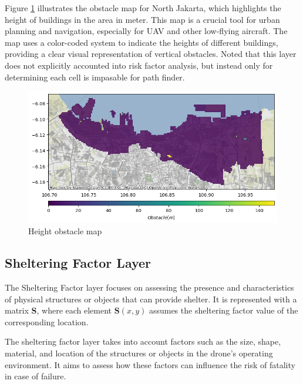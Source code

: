 \documentclass[12pt]{report}
\begin{document}
            Figure \ref{fig:obstacle} illustrates the obstacle map for North Jakarta, which highlights the height of
            buildings in the area in meter. This map is a crucial tool for urban planning and navigation, especially for
            UAV and other low-flying aircraft. The map uses a color-coded system to indicate the heights of different
            buildings, providing a clear visual representation of vertical obstacles. Noted that this layer does not
            explicitly accounted into risk factor analysis, but instead only for determining each cell is impasable for
            path finder.

            \begin{figure}[H]
                \label{fig:obstacle}
                \centering
                \includegraphics[width=\textwidth]{Plot/obstacle.png}
                \caption{Height obstacle map}
            \end{figure}

            \subsection{Sheltering Factor Layer}
                The Sheltering Factor layer focuses on assessing the presence and characteristics of physical structures
                or objects that can provide shelter. It is represented with a matrix \textbf{S}, where each element
                \(\mathbf{S}(x, y)\) assumes the sheltering factor value of the corresponding location.
                        
                The sheltering factor layer takes into account factors such as the size, shape, material, and location
                of the structures or objects in the drone's operating environment. It aims to assess how these factors
                can influence the risk of fatality in case of failure.
                        
\end{document}
